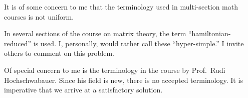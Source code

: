 \documentclass{article}
\begin{document}
It is of some concern to me   that 
the terminology used in  multi-section
 math courses is not uniform.

In several sections of the course on 
matrix theory, the  term   
 ``hamiltonian-reduced'' is used. 
  I, personally, would rather call these ``hyper-simple.'' I
invite others to comment on this  problem.

Of special concern to me is the terminology in the course 
by Prof.~Rudi Hochschwabauer.
  Since his field is new, there is
 no accepted
terminology.   It is imperative 
that we arrive at a satisfactory solution.
\end{document}
